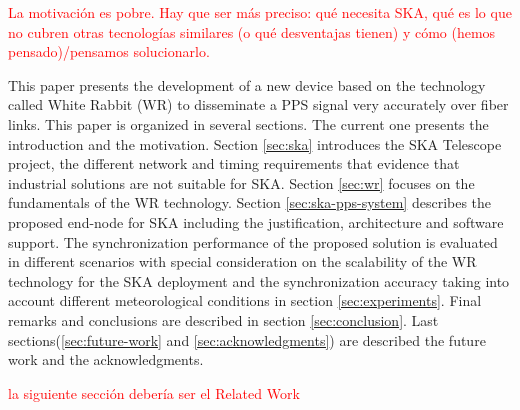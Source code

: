 \textcolor{red}{La motivación es pobre. Hay que ser más preciso: qué necesita SKA, qué es lo que no cubren otras tecnologías similares (o qué desventajas tienen) y cómo (hemos pensado)/pensamos solucionarlo.}


This paper presents the development of a new device based on the technology called White Rabbit (WR) \cite{ohwr:wr_wiki} to disseminate a PPS signal very accurately over fiber links. This paper is organized in several sections. The current one 
presents the introduction and the motivation. Section \ref{sec:ska} introduces the SKA Telescope project, the different network and timing requirements that 
evidence that industrial solutions are not suitable for SKA. Section 
\ref{sec:wr} focuses on the fundamentals of the WR technology. Section \ref{sec:ska-pps-system} 
describes the proposed end-node for SKA including the 
justification, architecture and software support. The synchronization 
performance of the proposed solution is evaluated in different scenarios with 
special consideration on the scalability of the WR technology for the SKA 
deployment and the synchronization accuracy taking into account different 
meteorological conditions in section \ref{sec:experiments}. Final remarks and conclusions are described in 
section \ref{sec:conclusion}. Last sections(\ref{sec:future-work} and \ref{sec:acknowledgments}) are described the future work and the 
acknowledgments.

\textcolor{red}{la siguiente sección debería ser el Related Work}
